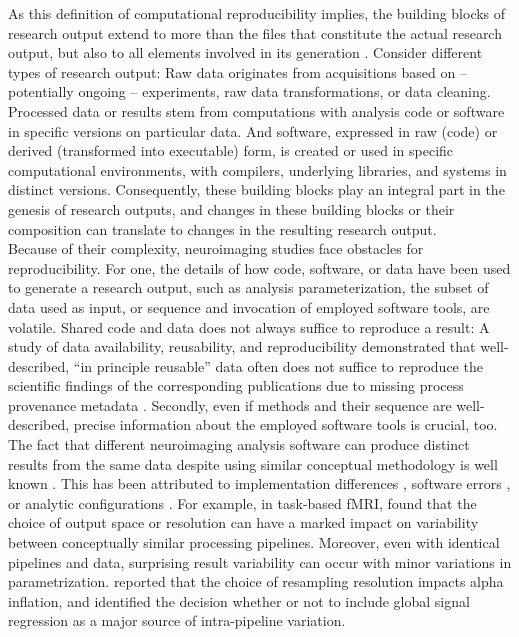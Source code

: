 As this definition of computational reproducibility implies, the building blocks of research output extend to more than the files that constitute the actual research output, but also to all elements involved in its generation \citep{claerbout1992electronic}.
Consider different types of research output:
Raw data originates from acquisitions based on -- potentially ongoing -- experiments, raw data transformations, or data cleaning.
Processed data or results stem from computations with analysis code or software in specific versions on particular data.
And software, expressed in raw (code) or derived (transformed into executable) form, is created or used in specific computational environments, with compilers, underlying libraries, and systems in distinct versions.
Consequently, these building blocks play an integral part in the genesis of research outputs, and changes in these building blocks or their composition can translate to changes in the resulting research output.\\
Because of their complexity, neuroimaging studies face obstacles for reproducibility.
For one, the details of how code, software, or data have been used to generate a research output, such as analysis parameterization, the subset of data used as input, or sequence and invocation of employed software tools, are volatile.
Shared code and data does not always suffice to reproduce a result:
A study of data availability, reusability, and reproducibility demonstrated that well-described, ``in principle reusable'' data often does not suffice to reproduce the scientific findings of the corresponding publications due to  missing process provenance metadata \citep{hardwicke2018data}.
Secondly, even if methods and their sequence are well-described, precise information about the employed software tools is crucial, too.
The fact that different neuroimaging analysis software can produce distinct results from the same data despite using similar conceptual methodology is well known \citep{bowring2019exploring}.
This has been attributed to implementation differences \citep{palumbo2019evaluation}, software errors \citep{eklund2016cluster}, or analytic configurations \citep{pauli2016exploring}.
For example, in task-based fMRI, \citet{li2021moving} found that the choice of output space or resolution can have a marked impact on variability between conceptually similar processing pipelines.
Moreover, even with identical pipelines and data, surprising result variability can occur with minor variations in parametrization.
\citet{mueller2017commentary} reported that the choice of resampling resolution impacts alpha inflation, and \citet{li2021moving} identified the decision whether or not to include global signal regression as a major source of intra-pipeline variation.

